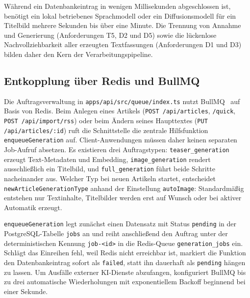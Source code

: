 Während ein Datenbankeintrag in wenigen Millisekunden abgeschlossen ist, benötigt ein lokal betriebenes Sprachmodell oder ein Diffusionsmodell für ein Titelbild mehrere Sekunden bis über eine Minute.
Die Trennung von Annahme und Generierung (Anforderungen T5, D2 und D5) sowie die lückenlose Nachvollziehbarkeit aller erzeugten Textfassungen (Anforderungen D1 und D3) bilden daher den Kern der Verarbeitungspipeline.

\subsection{Entkopplung über Redis und BullMQ}

Die Auftragsverwaltung in \texttt{apps/api/src/queue/index.ts} nutzt BullMQ~\cite{bullmq} auf Basis von Redis.
Beim Anlegen eines Artikels (\texttt{POST /api/articles}, \texttt{/quick}, \texttt{POST /api/import/rss}) oder beim Ändern seines Haupttextes (\texttt{PUT /api/articles/:id}) ruft die Schnittstelle die zentrale Hilfsfunktion \texttt{enqueueGeneration} auf.
Client-Anwendungen müssen daher keinen separaten Job-Aufruf absetzen.
Es existieren drei Auftragstypen: \texttt{teaser\_generation} erzeugt Text-Metadaten und Embedding, \texttt{image\_generation} rendert ausschließlich ein Titelbild, und \texttt{full\_generation} führt beide Schritte nacheinander aus.
Welcher Typ bei neuen Artikeln startet, entscheidet \texttt{newArticleGenerationType} anhand der Einstellung \texttt{autoImage}: Standardmäßig entstehen nur Textinhalte, Titelbilder werden erst auf Wunsch oder bei aktiver Automatik erzeugt.

\texttt{enqueueGeneration} legt zunächst einen Datensatz mit Status \texttt{pending} in der PostgreSQL-Tabelle \texttt{jobs} an und reiht anschließend den Auftrag unter der deterministischen Kennung \texttt{job-<id>} in die Redis-Queue \texttt{generation\_jobs} ein.
Schlägt das Einreihen fehl, weil Redis nicht erreichbar ist, markiert die Funktion den Datenbankeintrag sofort als \texttt{failed}, statt ihn dauerhaft als \texttt{pending} hängen zu lassen.
Um Ausfälle externer KI-Dienste abzufangen, konfiguriert BullMQ bis zu drei automatische Wiederholungen mit exponentiellem Backoff beginnend bei einer Sekunde.

